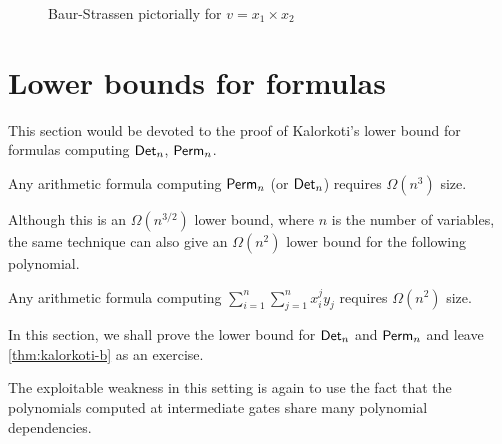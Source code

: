 \begin{figure}[h]
\begin{center}
\end{center}
\caption{Baur-Strassen pictorially for $v = x_1 \times x_2$}
\label{fig:baur-strassen}
\end{figure}


\section{Lower bounds for formulas}\label{sec:Kalorkoti}

This section would be devoted to the proof of Kalorkoti's lower bound \cite{k85} for formulas computing $\operatorname{\mathsf{Det}}_n$, $\operatorname{\mathsf{Perm}}_n$.

\begin{theorem}[\cite{k85}]\label{thm:kalorkoti}
  Any arithmetic formula computing $\operatorname{\mathsf{Perm}}_n$ (or $\operatorname{\mathsf{Det}}_n$) requires $\Omega(n^3)$ size.
\end{theorem}

Although this is an $\Omega(n^{3/2})$ lower bound, where $n$ is the number of variables, the same technique can also give an $\Omega(n^2)$ lower bound for the following polynomial.

\begin{theorem}[\cite{k85}]\label{thm:kalorkoti-b}
  Any arithmetic formula computing $\sum_{i=1}^n \sum_{j=1}^n x_i^j y_j$ requires $\Omega(n^2)$ size.
\end{theorem}

In this section, we shall prove the lower bound for $\operatorname{\mathsf{Det}}_n$ and $\operatorname{\mathsf{Perm}}_n$ and leave \autoref{thm:kalorkoti-b} as an exercise. 

The exploitable weakness in this setting is again to use the fact that the polynomials computed at intermediate gates share many polynomial dependencies.

